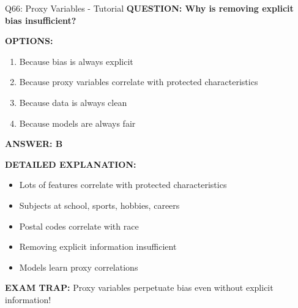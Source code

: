 \documentclass[8pt]{beamer}
\begin{document}
	\begin{frame}{Q66: Proxy Variables - Tutorial}
		\fontsize{6.5}{7.5}\selectfont
		\textbf{QUESTION: Why is removing explicit bias insufficient?}
		
		\vspace{0.1cm}
		\textbf{OPTIONS:}
		\begin{enumerate}
			\item Because bias is always explicit
			\item Because proxy variables correlate with protected characteristics
			\item Because data is always clean
			\item Because models are always fair
		\end{enumerate}
		
		\vspace{0.1cm}
		\textcolor{myblue}{\textbf{ANSWER: B}}
		
		\vspace{0.1cm}
		\textbf{DETAILED EXPLANATION:}
		\begin{itemize}
			\item Lots of features correlate with protected characteristics
			\item Subjects at school, sports, hobbies, careers
			\item Postal codes correlate with race
			\item Removing explicit information insufficient
			\item Models learn proxy correlations
		\end{itemize}
		
		\vspace{0.1cm}
		\textcolor{myred}{\textbf{EXAM TRAP:}} Proxy variables \textcolor{myblue}{perpetuate bias} even without explicit information!
	\end{frame}
	
\end{document}

